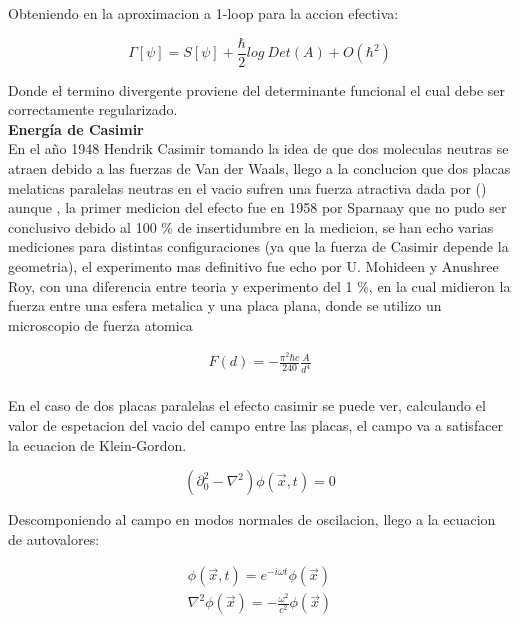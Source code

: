 Obteniendo en la aproximacion a 1-loop para la accion efectiva:

\begin{equation}
\Gamma [\psi] = S [\psi] + \frac{\hbar}{2} log \ Det (A) +
O ( \hbar ^2 )
\end{equation}

Donde el termino divergente proviene del determinante funcional el cual debe ser correctamente regularizado. \\


\textbf{Energía de Casimir} \\

En el año 1948 Hendrik Casimir tomando la idea de que dos moleculas neutras se atraen debido a las fuerzas de Van der Waals, llego a la conclucion que dos placas melaticas paralelas neutras en el vacio sufren una fuerza atractiva dada por (\label{casimir.1}) aunque , la primer medicion del efecto fue en 1958 por Sparnaay que no pudo ser conclusivo debido al 100 \% de insertidumbre en la medicion, se han echo varias mediciones para distintas configuraciones (ya que la fuerza de Casimir depende la geometria), el experimento mas definitivo fue echo por U. Mohideen y Anushree Roy, con una diferencia entre teoria y experimento del 1 \%, en la cual midieron la fuerza entre una esfera metalica y una placa plana, donde se utilizo un microscopio de fuerza atomica 


\begin{equation}
\begin{array}{c}
F(d) = - \frac{\pi ^2 \hbar c}{240} \frac{A}{d^4} \\
\end{array} 
\label{casimir.1}
\end{equation}




En el caso de dos placas paralelas el efecto casimir se puede ver, calculando el valor de espetacion del vacio del campo entre las placas, el campo va a satisfacer la ecuacion de Klein-Gordon.

\begin{equation}
( \partial _0 ^2 - \nabla  ^2  ) \phi (\vec{x} ,t) = 0 
\end{equation}

Descomponiendo al campo en modos normales de oscilacion, llego a la ecuacion de autovalores:

\begin{equation}
\begin{array}{c}
\phi ( \vec{x},t) = e ^{-i \omega t} \phi ( \vec{x}) \\
\nabla ^2 \phi ( \vec{x}) = - \frac{\omega ^2}{c ^2} \phi ( \vec{x})
\end{array}
\end{equation}

